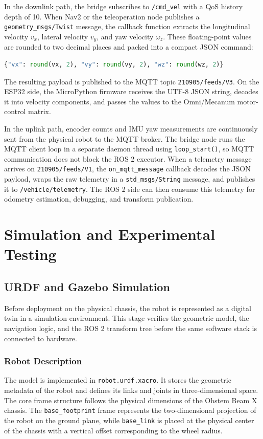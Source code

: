 \documentclass{llncs}
\begin{document}
In the downlink path, the bridge subscribes to \texttt{/cmd\_vel} with a QoS history depth of 10. When Nav2 or the teleoperation node publishes a \texttt{geometry\_msgs/Twist} message, the callback function extracts the longitudinal velocity $v_x$, lateral velocity $v_y$, and yaw velocity $\omega_z$. These floating-point values are rounded to two decimal places and packed into a compact JSON command:

\begin{lstlisting}[language=Python,caption={JSON velocity command published by the bridge node.}]
{"vx": round(vx, 2), "vy": round(vy, 2), "wz": round(wz, 2)}
\end{lstlisting}

The resulting payload is published to the MQTT topic \texttt{210905/feeds/V3}. On the ESP32 side, the MicroPython firmware receives the UTF-8 JSON string, decodes it into velocity components, and passes the values to the Omni/Mecanum motor-control matrix.

In the uplink path, encoder counts and IMU yaw measurements are continuously sent from the physical robot to the MQTT broker. The bridge node runs the MQTT client loop in a separate daemon thread using \texttt{loop\_start()}, so MQTT communication does not block the ROS 2 executor. When a telemetry message arrives on \texttt{210905/feeds/V1}, the \texttt{on\_mqtt\_message} callback decodes the JSON payload, wraps the raw telemetry in a \texttt{std\_msgs/String} message, and publishes it to \texttt{/vehicle/telemetry}. The ROS 2 side can then consume this telemetry for odometry estimation, debugging, and transform publication.

\section{Simulation and Experimental Testing}
\subsection{URDF and Gazebo Simulation}
Before deployment on the physical chassis, the robot is represented as a digital twin in a simulation environment. This stage verifies the geometric model, the navigation logic, and the ROS 2 transform tree before the same software stack is connected to hardware.

\subsubsection{Robot Description}
The model is implemented in \texttt{robot.urdf.xacro}. It stores the geometric metadata of the robot and defines its links and joints in three-dimensional space. The core frame structure follows the physical dimensions of the Ohstem Beam X chassis. The \texttt{base\_footprint} frame represents the two-dimensional projection of the robot on the ground plane, while \texttt{base\_link} is placed at the physical center of the chassis with a vertical offset corresponding to the wheel radius.
\end{document}
